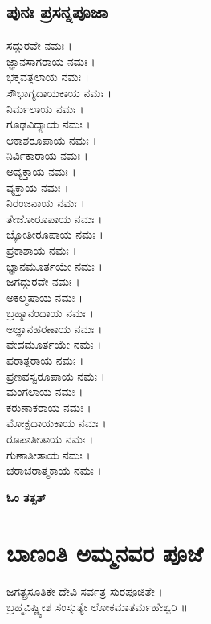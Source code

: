 \section{ಪುನಃ ಪ್ರಸನ್ನಪೂಜಾ}
ಸದ್ಗುರವೇ ನಮಃ । \\
ಜ್ಞಾನಸಾಗರಾಯ ನಮಃ । \\
ಭಕ್ತವತ್ಸಲಾಯ ನಮಃ । \\
ಸೌಭಾಗ್ಯದಾಯಕಾಯ ನಮಃ । \\
ನಿರ್ಮಲಾಯ ನಮಃ ।\\
ಗೂಢವಿದ್ಯಾಯ ನಮಃ ।\\
ಆಕಾಶರೂಪಾಯ ನಮಃ ।\\
ನಿರ್ವಿಕಾರಾಯ ನಮಃ ।\\
ಅವ್ಯಕ್ತಾಯ ನಮಃ ।\\
ವ್ಯಕ್ತಾಯ ನಮಃ ।\\
ನಿರಂಜನಾಯ ನಮಃ ।\\
ತೇಜೋರೂಪಾಯ ನಮಃ ।\\
ಜ್ಯೋತೀರೂಪಾಯ ನಮಃ ।\\
ಪ್ರಕಾಶಾಯ ನಮಃ ।\\
ಜ್ಞಾನಮೂರ್ತಯೇ ನಮಃ ।\\
ಜಗದ್ಗುರವೇ ನಮಃ ।\\
ಅಕಲ್ಮಷಾಯ ನಮಃ ।\\
ಬ್ರಹ್ಮಾನಂದಾಯ ನಮಃ ।\\
ಅಜ್ಞಾನಹರಣಾಯ ನಮಃ ।\\
ವೇದಮೂರ್ತಯೇ ನಮಃ ।\\
ಪರಾತ್ಪರಾಯ ನಮಃ ।\\
ಪ್ರಣವಸ್ವರೂಪಾಯ ನಮಃ ।\\
ಮಂಗಲಾಯ ನಮಃ ।\\
ಕರುಣಾಕರಾಯ ನಮಃ ।\\
ಮೋಕ್ಷದಾಯಕಾಯ ನಮಃ ।\\
ರೂಪಾತೀತಾಯ ನಮಃ ।\\
ಗುಣಾತೀತಾಯ ನಮಃ ।\\
ಚರಾಚರಾತ್ಮಕಾಯ ನಮಃ । 
\begin{center}{\LARGE\bfseries ಓಂ ತತ್ಸತ್}\end{center}
\chapter*{\center  ಬಾಣಂತಿ ಅಮ್ಮನವರ ಪೂಜೆ}
ಜಗತ್ಪ್ರಸೂತಿಕೇ ದೇವಿ ಸರ್ವತ್ರ ಸುರಪೂಜಿತೇ ।\\
ಬ್ರಹ್ಮವಿಷ್ಣ್ವೀಶ ಸಂಸ್ತುತ್ಯೇ ಲೋಕಮಾತರ್ಮಹೇಶ್ವರಿ ॥

